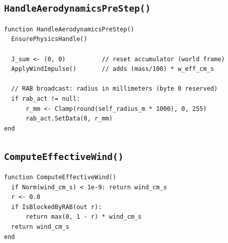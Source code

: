 \documentclass[11pt,a4paper]{article}
\begin{document}
\subsection{\texttt{HandleAerodynamicsPreStep()}}
\begin{lstlisting}[language=pseudo]
function HandleAerodynamicsPreStep()
  EnsurePhysicsHandle()

  J_sum <- (0, 0)          // reset accumulator (world frame)
  ApplyWindImpulse()       // adds (mass/100) * w_eff_cm_s

  // RAB broadcast: radius in millimeters (byte 0 reserved)
  if rab_act != null:
      r_mm <- Clamp(round(self_radius_m * 1000), 0, 255)
      rab_act.SetData(0, r_mm)
end
\end{lstlisting}

\subsection{\texttt{ComputeEffectiveWind()}}
\begin{lstlisting}[language=pseudo]
function ComputeEffectiveWind()
  if Norm(wind_cm_s) < 1e-9: return wind_cm_s
  r <- 0.0
  if IsBlockedByRAB(out r):
      return max(0, 1 - r) * wind_cm_s
  return wind_cm_s
end
\end{lstlisting}
\end{document}
